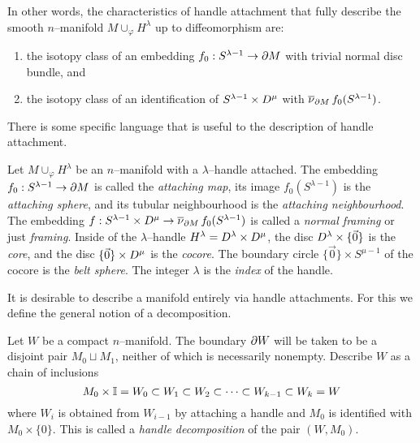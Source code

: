 In other words, the characteristics of handle attachment that fully describe the smooth $n$--manifold $M\cup_\varphi H^\lambda$ up to diffeomorphism are:
\begin{enumerate}
	\item the isotopy class of an embedding $f_0:S^{\lambda-1}\to\partial M$ with trivial normal disc bundle, and 
	\item the isotopy class of an identification of $S^{\lambda-1}\times D^\mu$ with $\overline{\nu}_{\partial M}\,f_0(S^{\lambda-1})$.
\end{enumerate}

There is some specific language that is useful to the description of handle attachment.

\begin{defn}
	Let $M\cup_\varphi H^\lambda$ be an $n$--manifold with a $\lambda$--handle attached.
	The embedding $f_0:S^{\lambda-1}\to\partial M$ is called the \emph{attaching map}, its image $f_0(S^{\lambda-1})$ is the \emph{attaching sphere}, and its tubular neighbourhood is the \emph{attaching neighbourhood}.
	The embedding $f: S^{\lambda-1}\times D^\mu\to \overline{\nu}_{\partial M}\,f_0(S^{\lambda-1})$ is called a \emph{normal framing} or just \emph{framing}.
	Inside of the $\lambda$--handle $H^\lambda=D^\lambda\times D^\mu$, the disc $D^\lambda\times\{\vec{0}\}$ is the \emph{core}, and the disc $\{\vec{0}\}\times D^\mu$ is the \emph{cocore}.
	The boundary circle $\{\vec{0}\}\times S^{\mu-1}$ of the cocore is the \emph{belt sphere}.
	The integer $\lambda$ is the \emph{index} of the handle.
\end{defn}

It is desirable to describe a manifold entirely via handle attachments.
For this we define the general notion of a decomposition.

\begin{defn}
	\label{def:morsehandle}
	Let $W$ be a compact $n$--manifold.
	The boundary $\partial W$ will be taken to be a disjoint pair $M_0\sqcup M_1$, neither of which is necessarily nonempty.
	Describe $W$ as a chain of inclusions
	\[
	M_0 \times\mathbb{I} = W_0 \subset W_1 \subset W_2 \subset \cdots \subset W_{k-1} \subset W_k = W
	\]
	where $W_i$ is obtained from $W_{i-1}$ by attaching a handle and $M_0$ is identified with $M_0\times \{0\}$.
	This is called a \emph{handle decomposition} of the pair $(W,M_0)$.
\end{defn}

